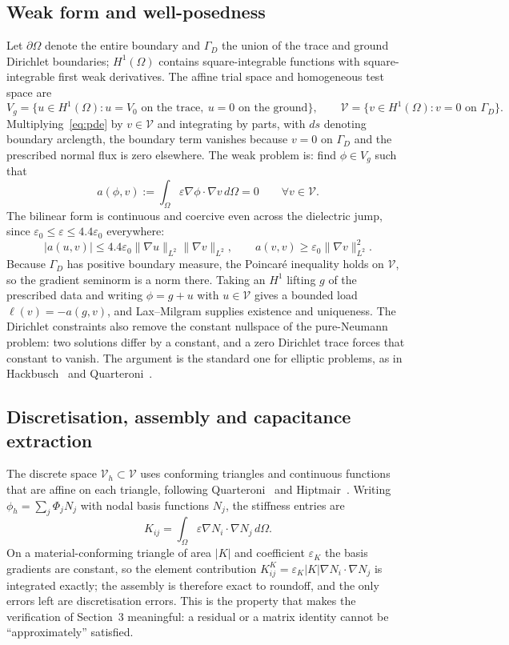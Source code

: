 \documentclass[11pt]{article}
\begin{document}
\subsection{Weak form and well-posedness}
Let $\partial\Omega$ denote the entire boundary and $\Gamma_D$ the union of the trace and
ground Dirichlet boundaries; $H^1(\Omega)$ contains square-integrable functions with
square-integrable first weak derivatives. The affine trial space and homogeneous test
space are
\[
V_g=\{u\in H^1(\Omega):u=V_0 \text{ on the trace},\ u=0 \text{ on the ground}\},
\qquad
\mathcal V=\{v\in H^1(\Omega):v=0 \text{ on }\Gamma_D\}.
\]
Multiplying~\eqref{eq:pde} by $v\in\mathcal V$ and integrating by parts, with $ds$
denoting boundary arclength, the boundary term vanishes because $v=0$ on $\Gamma_D$ and
the prescribed normal flux is zero elsewhere. The weak problem is: find $\phi\in V_g$ such
that
\begin{equation}
a(\phi,v):=\int_{\Omega}\varepsilon \nabla\phi\cdot\nabla v\,d\Omega=0
\qquad\forall v\in\mathcal V .
\label{eq:weak}
\end{equation}
The bilinear form is continuous and coercive even across the dielectric jump, since
$\varepsilon_0\le\varepsilon\le4.4\varepsilon_0$ everywhere:
\[
|a(u,v)|\le4.4\varepsilon_0\|\nabla u\|_{L^2}\|\nabla v\|_{L^2},
\qquad a(v,v)\ge\varepsilon_0\|\nabla v\|_{L^2}^2 .
\]
Because $\Gamma_D$ has positive boundary measure, the Poincar\'e inequality holds on
$\mathcal V$, so the gradient seminorm is a norm there. Taking an $H^1$ lifting $g$ of the
prescribed data and writing $\phi=g+u$ with $u\in\mathcal V$ gives a bounded load
$\ell(v)=-a(g,v)$, and Lax--Milgram supplies existence and uniqueness. The Dirichlet
constraints also remove the constant nullspace of the pure-Neumann problem: two solutions
differ by a constant, and a zero Dirichlet trace forces that constant to vanish. The
argument is the standard one for elliptic problems, as in
Hackbusch~\cite[Sec.~7.2]{hackbusch2017} and Quarteroni~\cite[Secs.~3.4 and 4.2]{quarteroni2017}.

\subsection{Discretisation, assembly and capacitance extraction}
The discrete space $\mathcal V_h\subset\mathcal V$ uses conforming triangles and
continuous functions that are affine on each triangle, following
Quarteroni~\cite[Sec.~4.5]{quarteroni2017} and Hiptmair~\cite[Sec.~2.4]{hiptmair2025}.
Writing $\phi_h=\sum_j\Phi_jN_j$ with nodal basis functions $N_j$, the stiffness entries
are
\begin{equation}
K_{ij}=\int_{\Omega}\varepsilon \nabla N_i\cdot \nabla N_j\,d\Omega .
\label{eq:stiffness}
\end{equation}
On a material-conforming triangle of area $|K|$ and coefficient $\varepsilon_K$ the basis
gradients are constant, so the element contribution
$K^K_{ij}=\varepsilon_K|K|\nabla N_i\cdot\nabla N_j$ is integrated exactly; the assembly is
therefore exact to roundoff, and the only errors left are discretisation errors. This is
the property that makes the verification of Section~3 meaningful: a residual or a matrix
identity cannot be ``approximately'' satisfied.
\end{document}
